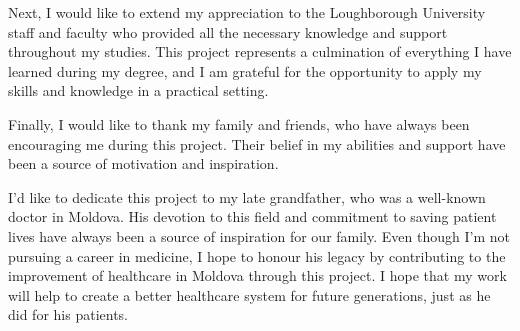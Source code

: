 Next, I would like to extend my appreciation to the Loughborough University staff and faculty who provided all the necessary knowledge and support throughout my studies. This project represents a culmination of everything I have learned during my degree, and I am grateful for the opportunity to apply my skills and knowledge in a practical setting.

Finally, I would like to thank my family and friends, who have always been encouraging me during this project. Their belief in my abilities and support have been a source of motivation and inspiration.

I'd like to dedicate this project to my late grandfather, who was a well-known doctor in Moldova. His devotion to this field and commitment to saving patient lives have always been a source of inspiration for our family. Even though I'm not pursuing a career in medicine, I hope to honour his legacy by contributing to the improvement of healthcare in Moldova through this project. I hope that my work will help to create a better healthcare system for future generations, just as he did for his patients.


\setcounter{tocdepth}{2}

\listoffigures

\tableofcontents

